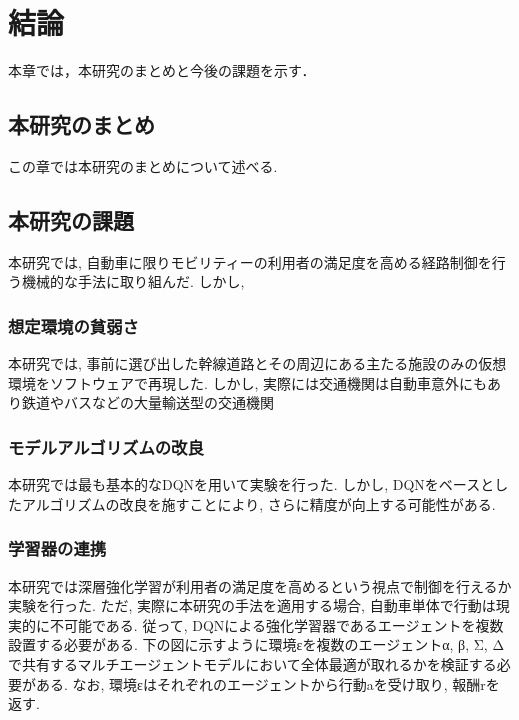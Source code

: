 \chapter{結論}
\label{conclusion}

本章では，本研究のまとめと今後の課題を示す．

\section{本研究のまとめ}

この章では本研究のまとめについて述べる.

\section{本研究の課題}

本研究では, 自動車に限りモビリティーの利用者の満足度を高める経路制御を行う機械的な手法に取り組んだ.
しかし,

\subsection{想定環境の貧弱さ}

本研究では, 事前に選び出した幹線道路とその周辺にある主たる施設のみの仮想環境をソフトウェアで再現した. 
しかし, 実際には交通機関は自動車意外にもあり鉄道やバスなどの大量輸送型の交通機関

\subsection{モデルアルゴリズムの改良}

本研究では最も基本的なDQNを用いて実験を行った. しかし, DQNをベースとしたアルゴリズムの改良を施すことにより, さらに精度が向上する可能性がある.

\subsection{学習器の連携}

本研究では深層強化学習が利用者の満足度を高めるという視点で制御を行えるか実験を行った.
ただ, 実際に本研究の手法を適用する場合, 自動車単体で行動は現実的に不可能である.
従って, DQNによる強化学習器であるエージェントを複数設置する必要がある. 下の図に示すように環境εを複数のエージェントα, β, Σ, Δで共有するマルチエージェントモデルにおいて全体最適が取れるかを検証する必要がある.
なお, 環境εはそれぞれのエージェントから行動aを受け取り, 報酬rを返す.



